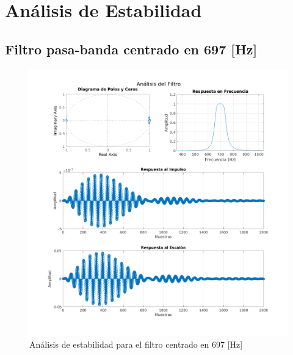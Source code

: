 \chapter{Análisis de Estabilidad}
\pagebreak

\section{Filtro pasa-banda centrado en 697 [Hz]}
\begin{figure}[H]
  \centering
  \includegraphics[width=\linewidth]{images/simulacion/697.png}
  \caption{Análisis de estabilidad para el filtro centrado en 697 [Hz]}
  \label{fig:analisis_697}
\end{figure}

